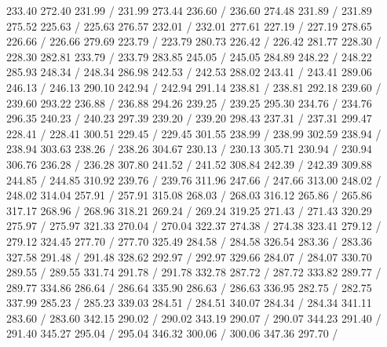 { 233.40 272.40 231.99 /
 231.99 273.44 236.60 /
 236.60 274.48 231.89 /
 231.89 275.52 225.63 /
 225.63 276.57 232.01 /
 232.01 277.61 227.19 /
 227.19 278.65 226.66 /
 226.66 279.69 223.79 /
 223.79 280.73 226.42 /
 226.42 281.77 228.30 /
 228.30 282.81 233.79 /
 233.79 283.85 245.05 /
 245.05 284.89 248.22 /
 248.22 285.93 248.34 /
 248.34 286.98 242.53 /
 242.53 288.02 243.41 /
 243.41 289.06 246.13 /
 246.13 290.10 242.94 /
 242.94 291.14 238.81 /
 238.81 292.18 239.60 /
 239.60 293.22 236.88 /
 236.88 294.26 239.25 /
 239.25 295.30 234.76 /
 234.76 296.35 240.23 /
 240.23 297.39 239.20 /
 239.20 298.43 237.31 /
 237.31 299.47 228.41 /
 228.41 300.51 229.45 /
 229.45 301.55 238.99 /
 238.99 302.59 238.94 /
 238.94 303.63 238.26 /
 238.26 304.67 230.13 /
 230.13 305.71 230.94 /
 230.94 306.76 236.28 /
 236.28 307.80 241.52 /
 241.52 308.84 242.39 /
 242.39 309.88 244.85 /
 244.85 310.92 239.76 /
 239.76 311.96 247.66 /
 247.66 313.00 248.02 /
 248.02 314.04 257.91 /
 257.91 315.08 268.03 /
 268.03 316.12 265.86 /
 265.86 317.17 268.96 /
 268.96 318.21 269.24 /
 269.24 319.25 271.43 /
 271.43 320.29 275.97 /
 275.97 321.33 270.04 /
 270.04 322.37 274.38 /
 274.38 323.41 279.12 /
 279.12 324.45 277.70 /
 277.70 325.49 284.58 /
 284.58 326.54 283.36 /
 283.36 327.58 291.48 /
 291.48 328.62 292.97 /
 292.97 329.66 284.07 /
 284.07 330.70 289.55 /
 289.55 331.74 291.78 /
 291.78 332.78 287.72 /
 287.72 333.82 289.77 /
 289.77 334.86 286.64 /
 286.64 335.90 286.63 /
 286.63 336.95 282.75 /
 282.75 337.99 285.23 /
 285.23 339.03 284.51 /
 284.51 340.07 284.34 /
 284.34 341.11 283.60 /
 283.60 342.15 290.02 /
 290.02 343.19 290.07 /
 290.07 344.23 291.40 /
 291.40 345.27 295.04 /
 295.04 346.32 300.06 /
 300.06 347.36 297.70 /
}
